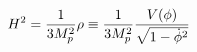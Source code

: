 \begin{equation}
H^2={1 \over 3M_p^2} \rho \equiv {1 \over 3M_p^2}{V(\phi) \over {\sqrt{1-\dot{\phi}^2}}}
\label{friedman}
\end{equation}


